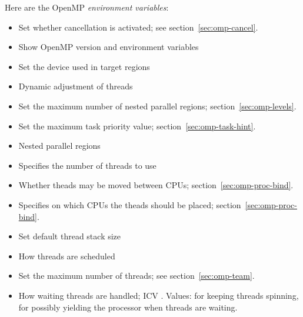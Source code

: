 Here are the OpenMP \emph{environment variables}:
\begin{itemize}
\item {} Set whether cancellation is activated;
  see section~\ref{sec:omp-cancel}.
\item {} Show OpenMP version and environment variables
\item {} Set the device used in target regions
\item {} Dynamic adjustment of threads
\item {} Set the maximum number of nested parallel
  regions; section~\ref{sec:omp-levels}.
\item {} Set the maximum task priority value;
  section~\ref{sec:omp-task-hint}.
\item {} Nested parallel regions
\item {} Specifies the number of threads to use
\item {} Whether theads may be moved between CPUs;
  section~\ref{sec:omp-proc-bind}.
\item {} Specifies on which CPUs the theads should be placed;
  section~\ref{sec:omp-proc-bind}.
\item {} Set default thread stack size
\item {} How threads are scheduled
\item {} Set the maximum number of threads;
  see section~\ref{sec:omp-team}.
\item {} How waiting threads are
  handled; \ac{ICV} . Values:
   for keeping threads spinning,  for possibly
  yielding the processor when threads are waiting.
\end{itemize}

